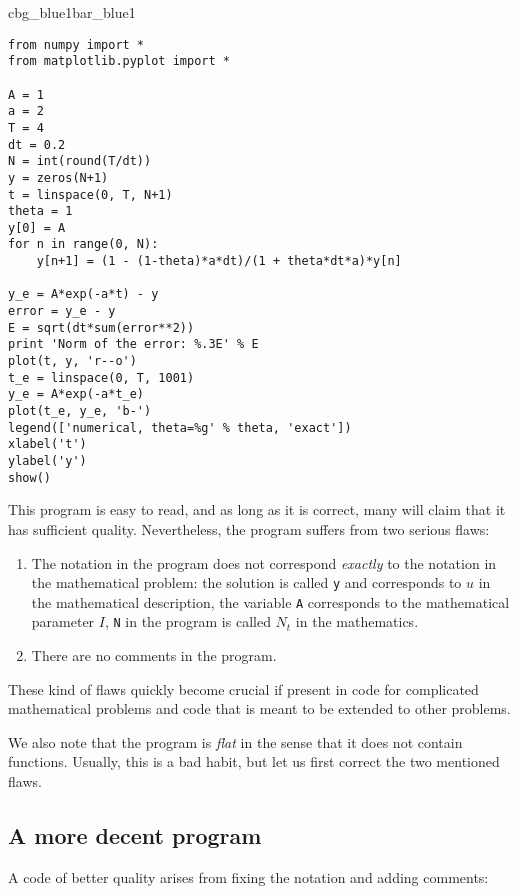 \documentclass[graybox,sectrefs,envcountresetchap,open=right,final]{svmonodo}
\newenvironment{_pro_tight}[2]{
   \def\FrameCommand{\color{#2}\vrule width 1mm\normalcolor\colorbox{#1}}
   \FrameRule0.6pt\MakeFramed {\advance\hsize-2mm\FrameRestore}\vskip3mm}
   {\vskip0mm\endMakeFramed}
\newenvironment{pro}[2]{
\bgroup\rmfamily
\fboxsep=0mm\relax
\begin{_pro_tight}{#1}{#2}
\list{}{\parsep=-2mm\parskip=0mm\topsep=0pt\leftmargin=2mm
\rightmargin=2\leftmargin\leftmargin=4pt\relax}
\item\relax}
{\endlist\end{_pro_tight}\egroup}
\begin{document}
\begin{pro}{cbg_blue1}{bar_blue1}\begin{Verbatim}[numbers=none,fontsize=\fontsize{9pt}{9pt},baselinestretch=0.95,xleftmargin=2mm]
from numpy import *
from matplotlib.pyplot import *

A = 1
a = 2
T = 4
dt = 0.2
N = int(round(T/dt))
y = zeros(N+1)
t = linspace(0, T, N+1)
theta = 1
y[0] = A
for n in range(0, N):
    y[n+1] = (1 - (1-theta)*a*dt)/(1 + theta*dt*a)*y[n]

y_e = A*exp(-a*t) - y
error = y_e - y
E = sqrt(dt*sum(error**2))
print 'Norm of the error: %.3E' % E
plot(t, y, 'r--o')
t_e = linspace(0, T, 1001)
y_e = A*exp(-a*t_e)
plot(t_e, y_e, 'b-')
legend(['numerical, theta=%g' % theta, 'exact'])
xlabel('t')
ylabel('y')
show()
\end{Verbatim}
\end{pro}
\noindent

This program is easy to read, and as long as it is correct, many will
claim that it has sufficient quality. Nevertheless, the program suffers
from two serious flaws:

\begin{enumerate}
\item The notation in the program does not correspond \emph{exactly} to
   the notation in the mathematical problem: the solution is called
   \texttt{y} and corresponds to $u$ in the mathematical description,
   the variable \texttt{A} corresponds to the mathematical parameter $I$,
   \texttt{N} in the program is called $N_t$ in the mathematics.

\item There are no comments in the program.
\end{enumerate}

\noindent
These kind of flaws quickly become crucial if present in code for complicated
mathematical problems and code that is meant to be extended to other problems.

We also note that the program is \emph{flat} in the sense that it does
not contain functions. Usually, this is a bad habit, but let us
first correct the two mentioned flaws.

\subsection{A more decent program}
\label{softeng1:basic:impl2}

A code of better quality arises from
fixing the notation and adding comments:
\end{document}
